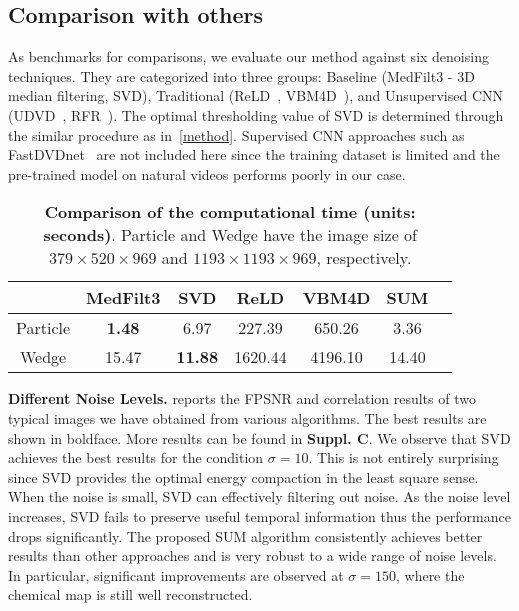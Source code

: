 \documentclass[10pt,twocolumn,letterpaper]{article}
\begin{document}
\subsection{Comparison with others}
\vspace{-4pt}
As benchmarks for comparisons, we evaluate our method against six denoising techniques. They are categorized into three groups: Baseline (MedFilt3 - 3D median filtering, SVD), Traditional (ReLD~\cite{guo2014online}, VBM4D~\cite{maggioni2012video}), and Unsupervised CNN (UDVD~\cite{sheth2021unsupervised}, RFR~\cite{lee2021restore}). The optimal thresholding value of SVD is determined through the similar procedure as in~\cref{method}. Supervised CNN approaches such as FastDVDnet~\cite{tassano2020fastdvdnet} are not included here since the training dataset is limited and the pre-trained model on natural videos performs poorly in our case. 
\begin{table}[!t]
    \centering
    \vspace{-2pt}
    \footnotesize{
    \begin{tabular}{ccccccc}
        \toprule
        
        \multicolumn{1}{c}{\phantom} &
        \multicolumn{1}{c}{MedFilt3} &
        \multicolumn{1}{c}{SVD} &
        \multicolumn{1}{c}{ReLD} &
        \multicolumn{1}{c}{VBM4D} &
        \multicolumn{1}{c}{SUM}  \\

        \midrule
         Particle & \textbf{1.48} & 6.97 & 227.39 & 650.26  & 3.36   \\
        \midrule
        Wedge & 15.47 & \textbf{11.88} & 1620.44& 4196.10  & 14.40   \\
        
        \bottomrule 
    \end{tabular}
    }
    \vspace{-5pt}
    \caption{\textbf{Comparison of the computational time (units: seconds)}. Particle and Wedge have the image size of $379 \times 520 \times 969$  and $1193\times 1193\times 969$, respectively.
        }
    \label{tab:runningtime}
    \vspace{-13pt}
\end{table}

\textbf{Different Noise Levels.}  reports the FPSNR and correlation results of two typical images we have obtained from various algorithms. The best results are shown in boldface. More results can be found in \textbf{Suppl. C}. We observe that SVD achieves the best results for the condition $\sigma=10$. This is not entirely surprising since SVD provides the optimal energy compaction in the least square sense. When the noise is small, SVD can effectively filtering out noise. As the noise level increases, SVD fails to preserve useful temporal information thus the performance drops significantly. The proposed SUM algorithm consistently achieves better results than other approaches and is very robust to a wide range of noise levels. In particular, significant improvements are observed at $\sigma=150$, where the chemical map is still well reconstructed.  
\end{document}
